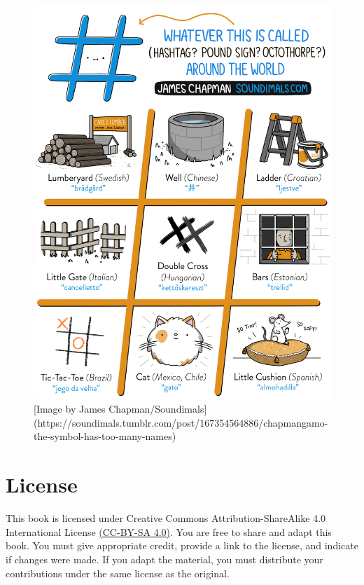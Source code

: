 \documentclass[
  oneside]{book}
\begin{document}
\begin{figure}

{\centering \includegraphics[width=1\linewidth]{images/soundimals_hash} 

}

\caption{[Image by James Chapman/Soundimals](https://soundimals.tumblr.com/post/167354564886/chapmangamo-the-symbol-has-too-many-names)}\label{fig:img-soundimals-hash}
\end{figure}

\hypertarget{license}{%
\chapter*{License}\label{license}}

This book is licensed under Creative Commons Attribution-ShareAlike 4.0 International License \href{https://creativecommons.org/licenses/by-sa/4.0/}{(CC-BY-SA 4.0)}. You are free to share and adapt this book. You must give appropriate credit, provide a link to the license, and indicate if changes were made. If you adapt the material, you must distribute your contributions under the same license as the original.

  
\end{document}

